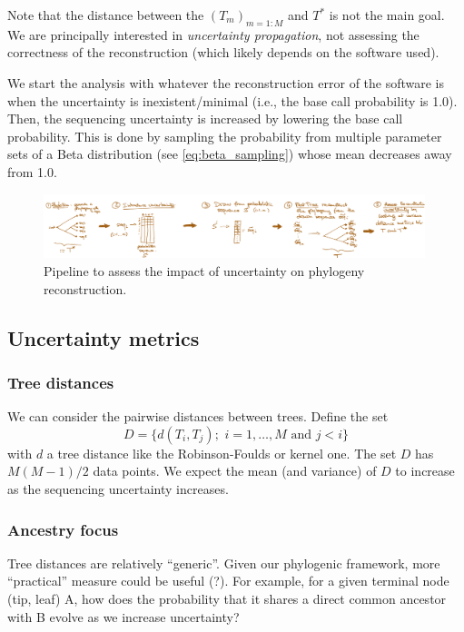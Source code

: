 \documentclass[12pt]{article}
\begin{document}
Note that the distance between the $(T_m)_{m=1:M}$ and $T^*$ is not the main goal. We are principally interested in \emph{uncertainty propagation}, not assessing the correctness of the reconstruction (which likely depends on the software used). 

We start the analysis with whatever the reconstruction error of the software is when the uncertainty is inexistent/minimal (i.e., the base call probability is 1.0). Then, the sequencing uncertainty is increased by lowering the base call probability. This is done by sampling the probability from multiple parameter sets of a Beta distribution (see \autoref{eq:beta_sampling}) whose mean decreases away from 1.0. 



\begin{figure}[H]
\begin{center}
 \includegraphics[width = 0.99\textwidth]{figs/pipeline.png}
\caption{Pipeline to assess the impact of uncertainty on phylogeny reconstruction.}
\label{fig:pipeline}
\end{center}
\end{figure}

\subsection{Uncertainty metrics}


\subsubsection*{Tree distances}

We can consider the pairwise distances between trees. 
Define the set $$D = \{d(T_i,T_j);\,\, i=1,\ldots, M \text{ and } j<i \}$$ with $d$ a tree distance like the Robinson-Foulds or kernel one. The set $D$ has ${M(M-1)/2}$ data points. 
We expect the mean (and variance) of $D$ to increase as the sequencing uncertainty increases. 

\subsubsection*{Ancestry focus}

Tree distances are relatively ``generic''. 
Given our phylogenic framework, more ``practical'' measure could be useful (?). 
For example, for a given terminal node (tip, leaf) A, how does the probability that it shares a direct common ancestor with B evolve as we increase uncertainty?
\end{document}
